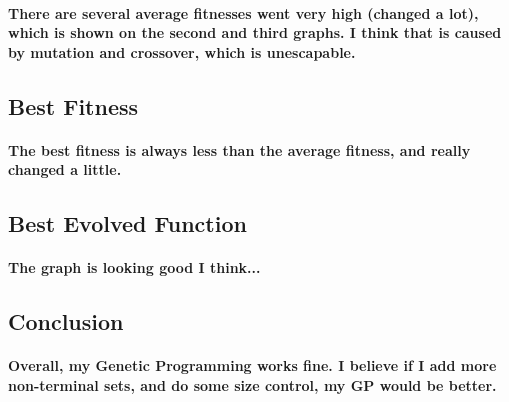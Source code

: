 \documentclass[11pt]{article} %
\begin{document}
\paragraph{There are several average fitnesses went very high (changed a lot), which is shown on the second and third graphs. I think that is caused by mutation and crossover, which is unescapable.}

\subsection{Best Fitness}
\paragraph{The best fitness is always less than the average fitness, and really changed a little.}

\subsection{Best Evolved Function}
\paragraph{The graph is looking good I think...}

\subsection{Conclusion}
\paragraph{Overall, my Genetic Programming works fine. I believe if I add more non-terminal sets, and do some size control, my GP would be better.}
\end{document}
